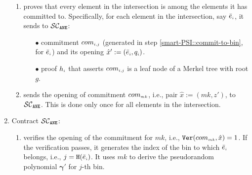 \begin{enumerate}
\begin{enumerate}
\item \label{extractor-proves} proves that every element in the intersection is among the elements it has committed to. Specifically, for each element in the intersection, say $\bar{e}_{\scriptscriptstyle i}$, it sends to $\mathcal{SC}_{\mathtt{ANE}}$: 



\begin{enumerate}
%
%
\item [$\bullet$]  commitment $com_{\scriptscriptstyle i,j}$ (generated in step \ref{smart-PSI::commit-to-bin}, for $\bar{e}_{\scriptscriptstyle i}$) and its  opening ${\hat x}':=(\bar{e}_{\scriptscriptstyle i},  q_{\scriptscriptstyle i})$. 


%
%

%
\item[$\bullet$]   proof $h_{\scriptscriptstyle i}$ that asserts $com_{\scriptscriptstyle i,j}$ is a leaf node of   a Merkel tree with  root $g$. 

 \end{enumerate}
\item sends the opening of commitment $com_{\scriptscriptstyle mk}$, i.e., pair $\hat {x}:=(mk, z')$, to $\mathcal{SC}_{\mathtt{ANE}}$. This is done only once for all elements in the intersection.  

 \end{enumerate}
\item\label{e-psi::SC-verification} Contract $\mathcal{SC}_{\mathtt{ANE}}$:
%
\begin{enumerate}

\item\label{e-psi::SC-verification--derive-mk}  verifies the opening of the commitment for $mk$, i.e., $\mathtt{Ver}(com_{\scriptscriptstyle mk},\hat{x})=1$. If the verification passes, it generates the index of the bin to which $ \bar{e}_{\scriptscriptstyle i}$ belongs, i.e., ${ {  {j}}}=\mathtt{H}(\bar {e}_{\scriptscriptstyle i})$. It  uses $mk$ to derive the pseudorandom polynomial $\bm\gamma'$ for $j$-th bin. 



\end{enumerate}
\end{enumerate}

